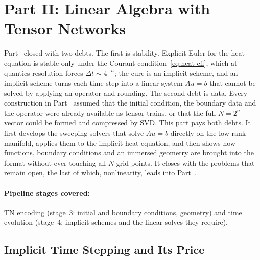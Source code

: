 \section{Part II: Linear Algebra with Tensor Networks}
\label{sec:part2}


Part~ closed with two debts. The first is stability. Explicit Euler
for the heat equation is stable only under the Courant
condition~\eqref{eq:heat-cfl}, which at quantics resolution forces
$\Delta t \sim 4^{-n}$; the cure is an implicit scheme, and an implicit scheme
turns each time step into a linear system $Au = b$ that cannot be solved by
applying an operator and rounding. The second debt is data. Every construction
in Part~ assumed that the initial condition, the boundary data and the
operator were already available as tensor trains, or that the full $N = 2^n$
vector could be formed and compressed by SVD. This part pays both debts. It first
develops the sweeping solvers that solve $Au = b$ directly on the low-rank
manifold, applies them to the implicit heat equation, and then shows how
functions, boundary conditions and an immersed geometry are brought into the
format without ever touching all $N$ grid points. It closes with the problems
that remain open, the last of which, nonlinearity, leads into
Part~.

\paragraph{Pipeline stages covered:} TN encoding (stage~3: initial and boundary
conditions, geometry) and time evolution (stage~4: implicit schemes and the
linear solves they require).


\subsection{Implicit Time Stepping and Its Price}
\label{subsec:heat-implicit-euler}

